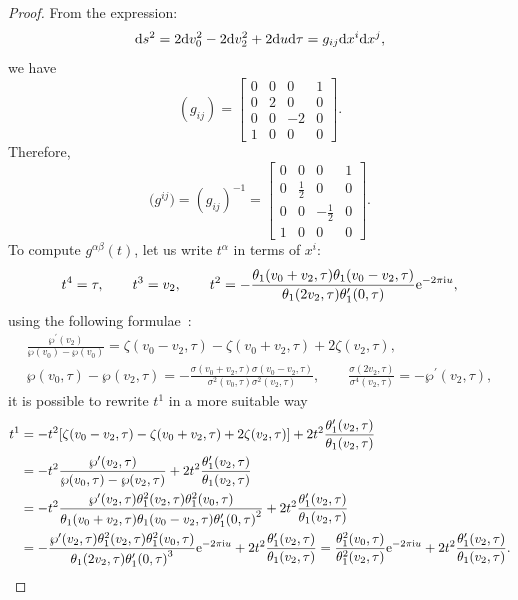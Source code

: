\documentclass[pdftex]{sigma}%
\numberwithin{equation}{section}
\begin{document}
\begin{proof}
 From the expression:
\begin{gather*}
{\rm d}s^2=2{\rm d}v_0^2-2{\rm d}v_2^2+2{\rm d}u {\rm d}\tau=g_{ij}{\rm d}x^i{\rm d}x^j,
\end{gather*}
we have
\[
(g_{ij})=
\begin{bmatrix}
 0 & 0 & 0 &1 \\
 0 & 2 &0 &0 \\
 0& 0 & -2 & 0 \\
 1 & 0 & 0 &0
\end{bmatrix}.
\]
Therefore,
\[
\big(g^{ij}\big)=(g_{ij})^{-1}=
\begin{bmatrix}
 0 & 0 & 0 &1 \\
 0 & \frac{1}{2} &0 &0 \\
 0& 0 & -\frac{1}{2} & 0 \\
 1 & 0 & 0 &0
\end{bmatrix}.
\]
To compute $g^{\alpha\beta}(t)$, let us write $t^{\alpha}$ in terms of $x^i$:
\begin{gather*}
t^4=\tau,\qquad t^3=v_2,\qquad
t^2=-\frac{\theta_1(v_0+v_2,\tau)\theta_1(v_0-v_2,\tau)} {\theta_1(2v_2,\tau)\theta_1^{\prime}(0,\tau)}{\rm e}^{-2\pi {\rm i} u},
\end{gather*}
using the following formulae~\cite{E.T.WhittakerandG.N.Watson}:
\begin{gather*}
\frac{\wp^{\prime}(v_2)}{\wp(v_0)-\wp(v_0)}=\zeta(v_0-v_2,\tau)-\zeta(v_0+v_{2},\tau)+2\zeta(v_2,\tau),
\\
\wp(v_0,\tau)-\wp(v_2,\tau)=-\frac{\sigma(v_0+v_2,\tau)\sigma(v_0-v_2,\tau)} {\sigma^2(v_0,\tau)\sigma^2(v_2,\tau)},
\qquad
\frac{\sigma(2v_2,\tau)}{\sigma^4(v_2,\tau)}=-\wp^{\prime}(v_2,\tau),
\end{gather*}
it is possible to rewrite $t^1$ in a more suitable way
\begin{align*}
t^1&=-t^2[\zeta(v_0-v_2,\tau)-\zeta(v_0+v_{2},\tau)+2\zeta(v_2,\tau)] +2t^2\frac{\theta_1^{\prime}(v_2,\tau)}{\theta_1(v_2,\tau)}
\\
&=-t^2\frac{\wp^{\prime}(v_2,\tau)}{\wp(v_0,\tau)-\wp(v_2,\tau)} +2t^2\frac{\theta_1^{\prime}(v_2,\tau)}{\theta_1(v_2,\tau)}
\\
&=-t^2\frac{\wp^{\prime}(v_2,\tau)\theta_1^2(v_2,\tau)\theta_1^2(v_0,\tau)} {\theta_1(v_0+v_2,\tau)\theta_1(v_0-v_2,\tau){\theta_1^{\prime}(0,\tau)}^2} +2t^2\frac{\theta_1^{\prime}(v_2,\tau)}{\theta_1(v_2,\tau)}
\\
&=-\frac{\wp^{\prime}(v_2,\tau)\theta_1^2(v_2,\tau)\theta_1^2(v_0,\tau)} {\theta_1(2v_2,\tau){\theta_1^{\prime}(0,\tau)}^3}{\rm e}^{-2\pi {\rm i} u}+2t^2\frac{\theta_1^{\prime}(v_2,\tau)}{\theta_1(v_2,\tau)}
=\frac{\theta_1^2(v_0,\tau)}{\theta_1^2(v_2,\tau)}{\rm e}^{-2\pi {\rm i} u}+2t^2\frac{\theta_1^{\prime}(v_2,\tau)}{\theta_1(v_2,\tau)}.
\end{align*}


\end{proof}
\end{document}
